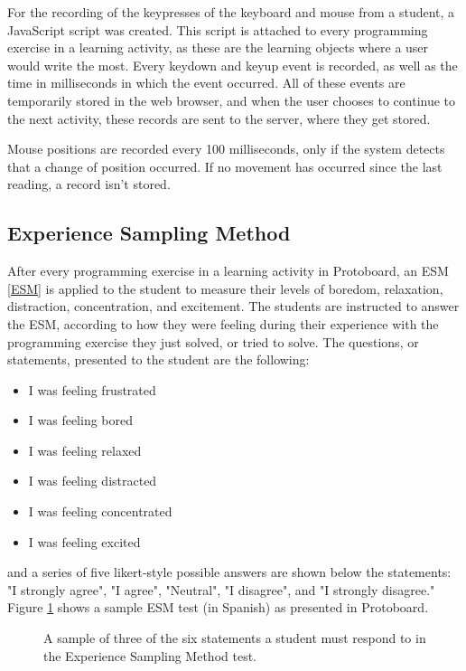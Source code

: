 \documentclass{acm_proc_article-sp}
\begin{document}
For the recording of the keypresses of the keyboard and mouse from a
student, a JavaScript script was created. This script is attached to
every programming exercise in a learning activity, as these are the
learning objects where a user would write the most. Every keydown and
keyup event is recorded, as well as the time in milliseconds in which the event
occurred. All of these events are temporarily stored in the web
browser, and when the user chooses to continue to the next activity,
these records are sent to the server, where they get stored.

Mouse positions are recorded every 100 milliseconds, only if the
system detects that a change of position occurred. If no movement has
occurred since the last reading, a record isn't stored.


\subsection{Experience Sampling Method}
\label{PM-ESM}

After every programming exercise in a learning activity in
Protoboard, an ESM \ref{ESM} is applied to the student to measure their levels
of boredom, relaxation, distraction, concentration, and
excitement. The students are instructed to answer the ESM,
according to how they were feeling during their experience with the
programming exercise they just solved, or tried to solve. The
questions, or statements, presented to the student are the following:

\begin{itemize}
  \item I was feeling frustrated
  \item I was feeling bored
  \item I was feeling relaxed
  \item I was feeling distracted
  \item I was feeling concentrated
  \item I was feeling excited
\end{itemize}

and a series of five likert-style possible answers are shown below the
statements: "I strongly agree", "I agree", "Neutral", "I disagree",
and "I strongly disagree." Figure \ref{fig:ESM-test} shows a sample
ESM test (in Spanish) as presented in Protoboard.

\begin{figure}
  \centering
  \caption{A sample of three of the six statements a student must
    respond to in the Experience Sampling Method test.}
  \label{fig:ESM-test}
\end{figure}
\end{document}
